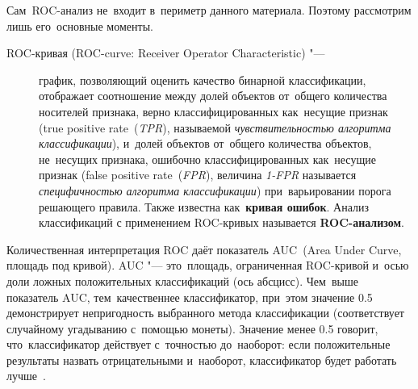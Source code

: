\documentclass[]{scrreprt}
\begin{document}
Сам~ROC-анализ не~входит в~периметр данного материала. Поэтому рассмотрим лишь его~основные моменты.
\begin{description}
	\item[ROC-кривая \foreignlanguage{english}{(ROC-curve: Receiver Operator Characteristic)} "---] график, позволяющий оценить качество бинарной классификации, отображает соотношение между долей объектов от~общего количества носителей признака, верно классифицированных как~несущие признак (\foreignlanguage{english}{true positive rate~(\emph{TPR})}, называемой \emph{чувствительностью алгоритма классификации}), и~долей объектов от~общего количества объектов, не~несущих признака, ошибочно классифицированных как~несущие признак (\foreignlanguage{english}{false positive rate~(\emph{FPR})}, величина \emph{1-FPR} называется \emph{специфичностью алгоритма классификации}) при~варьировании порога решающего правила. Также известна как~\textbf{кривая ошибок}. Анализ классификаций с применением ROC-кривых называется \textbf{ROC-анализом}. 
\end{description}
Количественная интерпретация ROC даёт показатель AUC~(\foreignlanguage{english}{Area Under Curve}, площадь под кривой). AUC "--- это~площадь, ограниченная ROC-кривой и~осью доли ложных положительных классификаций (ось абсцисс). Чем~выше показатель AUC, тем~качественнее классификатор, при~этом значение 0.5 демонстрирует непригодность выбранного метода классификации (соответствует случайному угадыванию с~помощью монеты). Значение менее 0.5 говорит, что~классификатор действует с~точностью до~наоборот: если положительные результаты назвать отрицательными и~наоборот, классификатор будет работать лучше~\cite{Wiki:ROC}.
\end{document}
